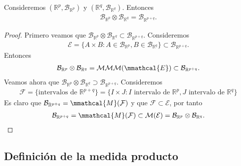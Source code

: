 \begin{prop}
Consideremos $(\mathbb{R}^p, \mathcal{B}_{\mathbb{R}^p})$ y $(\mathbb{R}^q, \mathcal{B}_{\mathbb{R}^q})$. Entonces
\begin{align*}
    \mathcal{B}_{\mathbb{R}^p} \otimes \mathcal{B}_{\mathbb{R}^q} = \mathcal{B}_{\mathbb{R}^{p+q}}.
\end{align*}
\end{prop}

\begin{proof}
Primero veamos que $\mathcal{B}_{\mathbb{R}^p} \otimes \mathcal{B}_{\mathbb{R}^q} \subset \mathcal{B}_{\mathbb{R}^{p+q}}$. Consideremos
\begin{align*}
    \mathcal{E} = \{A \times B : A \in \mathcal{B}_{\mathbb{R}^p}, B \in \mathcal{B}_{\mathbb{R}^q} \} \subset \mathcal{B}_{\mathbb{R}^{p+q}}.
\end{align*}
Entonces
\begin{align*}
    \mathcal{B}_{\mathbb{R}^p} \otimes \mathcal{B}_{\mathbb{R}^q} = \mathcal{MMM}(\mmathcal{E}) \subset \mathcal{B}_{\mathbb{R}^{p+q}}.
\end{align*}
Veamos ahora que  $\mathcal{B}_{\mathbb{R}^p} \otimes \mathcal{B}_{\mathbb{R}^q} \supset \mathcal{B}_{\mathbb{R}^{p+q}}$. Consideremos
\begin{align*}
    \mathcal{F} = \{ \text{intervalos de } \mathbb{R}^{p+q} \} = \{ I \times J : I \text{ intervalo de } \mathbb{R}^p, J \text{ intervalo de } \mathbb{R}^q\}
\end{align*}
Es claro que $\mathcal{B}_{\mathbb{R}^{p+q}} = \mmathcal{M}(\mathcal{F})$ y que $\mathcal{F} \subset \mathcal{E}$, por tanto
\begin{align*}
    \mathcal{B}_{\mathbb{R}^{p+q}} = \mmathcal{M}(\mathcal{F}) \subset \mathcal{M}(\mathcal{E}) = \mathcal{B}_{\mathbb{R}^p} \otimes \mathcal{B}_{\mathbb{R}^q}. 
\end{align*}
\end{proof}

\subsection{Definición de la medida producto}

